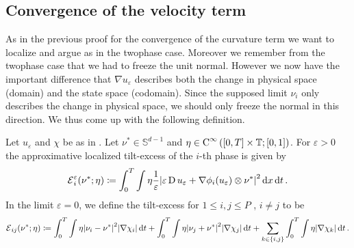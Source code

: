 \subsection{Convergence of the velocity term}

As in the previous proof for the convergence of the curvature term we want to 
localize and argue as in the twophase case. Moreover we remember from the 
twophase case that we had to freeze the unit normal. However we now have the 
important difference that $ \nabla u_{ \varepsilon } $ describes both the 
change in physical space (domain) and the state space (codomain). Since the 
supposed limit $ \nu_{ i } $ only describes the change in physical space, we 
should only freeze the normal in this direction. We thus come up with the 
following definition.

\begin{comment}Using the equipartition of 
energies (\Cref{equipartition_of_energies_multiphase}) which tells us that $ 
\varepsilon / 2 \abs{ \nabla u_{ \varepsilon } }^{ 2 } $ roughly equals $ 1 / 
\varepsilon W ( u_{ \varepsilon } ) $, we come up with the following definition 
which is similar to the tilt-excess defined in the twophase case.
\end{comment}

\begin{definition}
	Let $ u _{ \varepsilon } $ and $ \chi $ be as in 
	.
	Let $ \nu^{ \ast } \in \mathbb{ S }^{ d - 1 } $ and $ \eta \in \operatorname{C}^{ 
		\infty } \left( [ 0 , T ] \times \operatorname{\mathbb{T}} ; [ 0 , 1 ] \right) $. For 
		$ 
	\varepsilon > 0 $  the 
	approximative localized tilt-excess of the $ i$-th phase is given by
	\begin{equation*}
		\tilt_excess_{ i }^{ \varepsilon } ( \nu^{ \ast } ; \eta )
		\coloneqq
		\int_{ 0 }^{ T }
		\int
		\eta
		\frac{ 1 }{ \varepsilon }
		\abs{ 
			\varepsilon \diff u_{ \varepsilon } 
			+
			\nabla \phi_{ i } ( u_{ \varepsilon } ) 
			\otimes
			\nu^{ \ast }
		}^{ 2 }
		\dd{ x }
		\dd{ t }.
	\end{equation*}
	In the limit $ \varepsilon = 0 $,
	we define the tilt-excess for $ 1 \leq i, j \leq P $ , $ i \neq j $ to be
	\begin{equation*}
		\tilt_excess_{ i j } ( \nu^{ \ast } ; \eta  ) 
		\coloneqq
		\int_{ 0 }^{ T }
		\int
		\eta
		\abs{ \nu_{ i } - \nu^{ \ast } }^{ 2 }
		\abs{ \nabla \chi_{ i } }
		\dd{ t }
		+
		\int_{ 0 }^{ T }
		\int
		\eta
		\abs{ \nu_{ j } + \nu^{ \ast } }^{ 2 }
		\abs{ \nabla \chi_{ j } }
		\dd{ t }
		+
		\sum_{ k \in \{ i , j \} }
		\int_{ 0 }^{ T }
		\int
		\eta 
		\abs{ \nabla \chi_{ k } }
		\dd{ t }.
	\end{equation*}
\end{definition}


